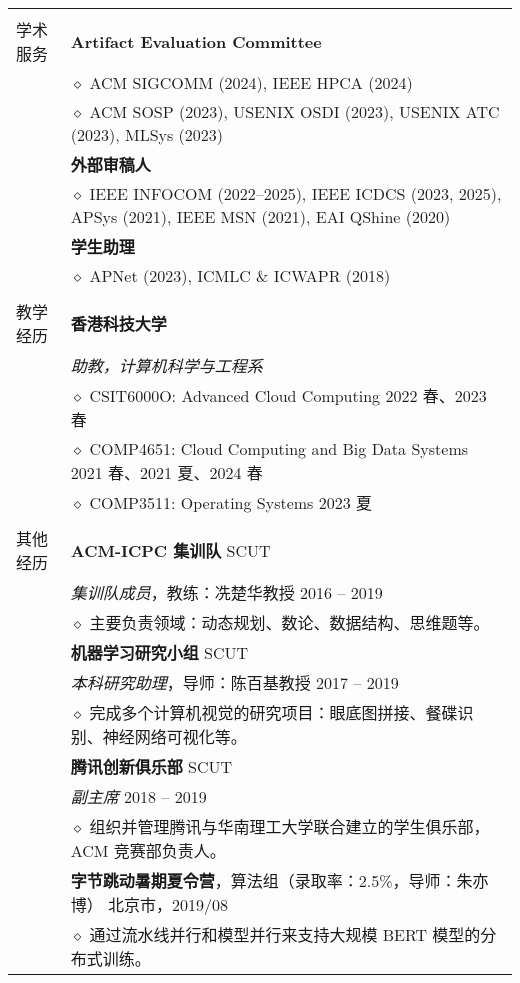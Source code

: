 \documentclass[letterpaper, 10pt]{article}
\begin{document}
\begin{longtable}{p{0.7in}p{6.0in}}
& \\

{学术服务}
& \textbf{Artifact Evaluation Committee} \\
& $\diamond$ ACM SIGCOMM (2024), IEEE HPCA (2024)\\
& $\diamond$ ACM SOSP (2023), USENIX OSDI (2023), USENIX ATC (2023), MLSys (2023)\\
& \textbf{外部审稿人} \\
& $\diamond$ IEEE INFOCOM (2022--2025), IEEE ICDCS (2023, 2025), APSys (2021), IEEE MSN (2021), EAI QShine (2020) \\
& \textbf{学生助理} \\
& $\diamond$ APNet (2023), ICMLC \& ICWAPR (2018) \\
& \\

{教学经历}
& \textbf{香港科技大学} \\
& \textit{助教，计算机科学与工程系} \\
& $\diamond$ CSIT6000O: Advanced Cloud Computing \hfill 2022 春、2023 春\\
& $\diamond$ COMP4651: Cloud Computing and Big Data Systems \hfill 2021 春、2021 夏、2024 春\\
& $\diamond$ COMP3511: Operating Systems \hfill 2023 夏 \\
& \\

{其他经历}
& \textbf{ACM-ICPC 集训队} \hfill SCUT \\
& \textit{集训队成员}，教练：冼楚华教授 \hfill 2016 -- 2019 \\
& $\diamond$ 主要负责领域：动态规划、数论、数据结构、思维题等。 \\

& \textbf{机器学习研究小组} \hfill SCUT \\
& \textit{本科研究助理}，导师：陈百基教授 \hfill 2017 -- 2019 \\
& $\diamond$ 完成多个计算机视觉的研究项目：眼底图拼接、餐碟识别、神经网络可视化等。\\

& \textbf{腾讯创新俱乐部} \hfill SCUT \\
& \textit{副主席} \hfill 2018 -- 2019 \\
& $\diamond$ 组织并管理腾讯与华南理工大学联合建立的学生俱乐部，ACM 竞赛部负责人。 \\

& \textbf{字节跳动暑期夏令营}，算法组（录取率：2.5\%，导师：朱亦博） \hfill 北京市，2019/08\\
& $\diamond$ 通过流水线并行和模型并行来支持大规模 BERT 模型的分布式训练。\\


\end{longtable}
\end{document}
